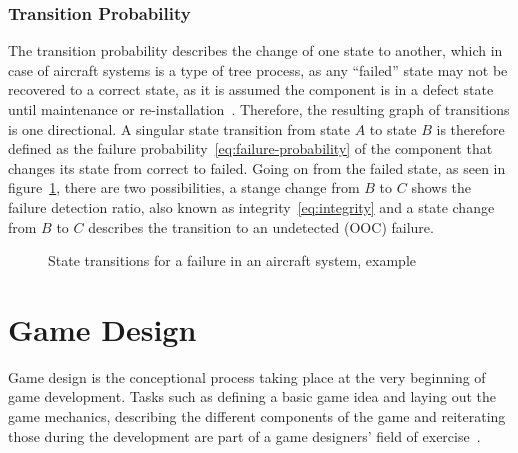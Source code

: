 \subsubsection{Transition Probability}\label{subsubsec:transition-probability}
The transition probability describes the change of one state to another, which in case of aircraft systems is a type of tree
process, as any ``failed'' state may not be recovered to a correct state, as it is assumed the component is in a defect state until
maintenance or re-installation~\cite{markov-processes}.
Therefore, the resulting graph of transitions is one directional.
A singular state transition from state $A$ to state $B$ is therefore defined as the failure probability~\ref{eq:failure-probability}
of the component that changes its state from correct to failed.
Going on from the failed state, as seen in figure~\ref{fig:state-change}, there are two possibilities,
a stange change from $B$ to $C$ shows the failure detection ratio, also known as integrity~\ref{eq:integrity}
and a state change from $B$ to $C$ describes the transition to an undetected (\gls{OOC}) failure.
\begin{figure}
    \begin{center}
    \end{center}
    \caption{State transitions for a failure in an aircraft system, example}
    \label{fig:state-change}
\end{figure}
\section{Game Design}\label{sec:game-design}
Game design is the conceptional process taking place at the very beginning of game development.
Tasks such as defining a basic game idea and laying out the game mechanics, describing the different components of the game and
reiterating those during the development are part of a game designers' field of exercise~\cite{10.5555/2544002}.

